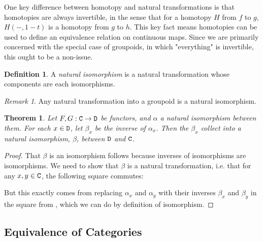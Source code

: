 \documentclass[11 pt]{amsart}
\theoremstyle{plain}   %
\newtheorem{thm}{Theorem}[section] %
\theoremstyle{definition}
\newtheorem{defn}{Definition}[section]
\theoremstyle{remark}
\newtheorem{rem}{Remark}[section]
\numberwithin{equation}{section}
\newcommand{\cat}[1]{{\normalfont\texttt{#1}}}
\begin{document}
One key difference between homotopy and natural transformations is that
homotopies are always invertible, in the sense that for a homotopy $H$ from $f$
to $g$, $H(-, 1-t)$ is a homotopy from $g$ to $h$. This key fact means
homotopies can be used to define an equivalence relation on continuous maps.
Since we are primarily concerned with the special case of groupoids, in which
"everything" is invertible, this ought to be a non-issue.

\begin{defn}
	A \emph{natural isomorphism} is a natural transformation whose components are
	each isomorphisms.
\end{defn}

\begin{rem}
	Any natural transformation into a groupoid is a natural isomorphism.
\end{rem}

\begin{thm}\label{natural isomorphisms are invertible}
	Let $F,G: \cat{C}\rightarrow\cat{D}$ be functors, and $\alpha$ a natural
	isomorphism between them. For each $x\in\cat{D}$, let $\beta_x$ be the
	inverse of $\alpha_x$. Then the $\beta_x$ collect into a natural
	isomorphism, $\beta$, between $\cat{D}$ and $\cat{C}$.
\end{thm}

\begin{proof}
	That $\beta$ is an isomorphism follows because inverses of isomorphisms are
	isomorphisms. We need to show that $\beta$ is a natural transformation, i.e.
	that for any $x, y\in\cat{C}$, the following square commutes:

	\begin{figure}[H]
		\centering
	\end{figure}

	But this exactly comes from replacing $\alpha_x$ and $\alpha_y$ with their
	inverses $\beta_x$ and $\beta_y$ in the square from , which we can do by definition of isomorphism.

\end{proof}

\subsection{Equivalence of Categories}
\end{document}

